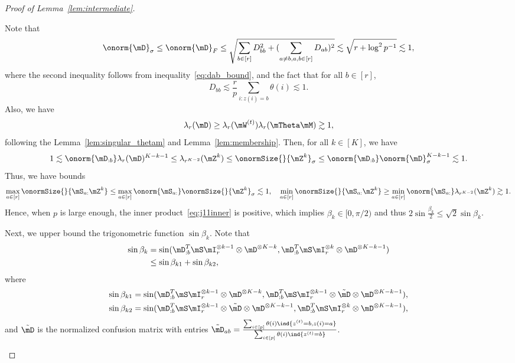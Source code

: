 \documentclass[lettersize,onecolumn,journal]{IEEEtran}
\theoremstyle{definition}
\theoremstyle{definition}
\begin{document}
\begin{proof}[Proof of Lemma~\ref{lem:intermediate}]
\begin{enumerate}[wide]
    Note that 
    \begin{equation}\label{eq:singular_Du}
        \onorm{\mD}_{\sigma} \leq \onorm{\mD}_{F} \leq  \sqrt{\sum_{b \in [r]} D_{bb}^2 + (\sum_{a \neq b, a ,b \in [r]} D_{ab} )^2} \lesssim \sqrt{r  + \log^2 p^{-1}} \lesssim 1,
    \end{equation}
    where the second inequality follows from inequality~\eqref{eq:dab_bound}, and the fact that for all $b \in [r]$,
    \begin{equation}
        D_{bb} \lesssim \frac{r}{p} \sum_{i\colon z(i) = b} \theta(i) \lesssim 1.
    \end{equation}
    Also, we have 
    \begin{equation}\label{eq:singular_Dl}
        \lambda_r(\mD) \geq \lambda_r(\mW^{(t)}) \lambda_r(\mTheta \mM) \gtrsim 1,
    \end{equation}
    following the Lemma~\ref{lem:singular_thetam} and Lemma~\ref{lem:membership}. Then, for all $k \in [K]$, we have 
    \begin{equation}\label{eq:singular_z}
       1 \lesssim \onorm{\mD_{:b}} \lambda_r(\mD)^{K-k-1}  \leq \lambda_{r^{K-2}}(\mZ^{k}) \leq \onormSize{}{\mZ^k}_{\sigma} \leq \onorm{\mD_{:b}} \onorm{\mD}_{\sigma}^{K-k-1} \lesssim 1.
    \end{equation}
    Thus, we have bounds 
    \begin{equation}
         \max_{a \in [r]} \onormSize{}{\mS_{a:} \mZ^k} \leq \max_{a \in [r]} \onorm{\mS_{a:}} \onormSize{}{\mZ^k}_{\sigma} \lesssim 1, \quad \min_{a \in [r]} \onormSize{}{\mS_{a:}\mZ^k}  \geq \min_{a \in [r]} \onorm{\mS_{a:}} \lambda_{r^{K-2}}(\mZ^{k}) \gtrsim 1.
    \end{equation}
    Hence, when $p$ is large enough, the inner product~\eqref{eq:j11inner} is positive, which implies $\beta_k \in [0, \pi/2)$ and thus $2 \sin \frac{\beta_k}{2} \leq \sqrt{2} \sin \beta_k$.
    
    Next, we upper bound the trigonometric function $\sin \beta_k$. Note that
    \begin{align}
         \sin \beta_k &= \sin ({\mD_{:b}^{T} \mS \mI_r^{\otimes k-1} \otimes \mD^{\otimes K-k} }, {\mD_{:b}^{T} \mS \mI_r^{\otimes k} \otimes \mD^{\otimes K-k-1} } )\\
         &\leq \sin \beta_{k1} + \sin \beta_{k2},
    \end{align}
    where
    \begin{align}
         \sin \beta_{k1} &= \sin ({\mD_{:b}^{T} \mS \mI_r^{\otimes k-1} \otimes \mD^{\otimes K-k} }, {\mD_{:b}^{T} \mS \mI_r^{\otimes k-1} \otimes \tilde \mD \otimes \mD^{\otimes K-k-1} } ),\\
         \sin \beta_{k2} & = \sin ({\mD_{:b}^{T} \mS \mI_r^{\otimes k-1} \otimes \tilde \mD \otimes \mD^{\otimes K-k-1} } , {\mD_{:b}^{T} \mS \mI_r^{\otimes k} \otimes \mD^{\otimes K-k-1} }   ),
    \end{align}
    and $\tilde \mD$ is the normalized confusion matrix with entries $\tilde \mD_{ab} = \frac{\sum_{i \in [p]} \theta(i) \ind\{z^{(t)} = b, z(i) = a\}}{\sum_{i \in [p] }\theta(i) \ind\{z^{(t)} = b\}}$.
    

\end{enumerate}
\end{proof}
\end{document}
